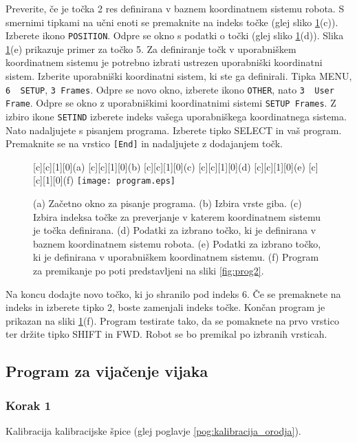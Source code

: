 Preverite, če je točka 2 res definirana v baznem koordinatnem sistemu robota. S smernimi tipkami na učni enoti se premaknite na indeks točke (glej sliko \ref{fig:program}(c)). Izberete ikono \verb|POSITION|. Odpre se okno s podatki o točki (glej sliko \ref{fig:program}(d)). Slika \ref{fig:program}(e) prikazuje primer za točko 5. Za definiranje točk v uporabniškem koordinatnem sistemu je potrebno izbrati ustrezen uporabniški koordinatni sistem. Izberite uporabniški koordinatni sistem, ki ste ga definirali. Tipka MENU, \verb|6  SETUP|, \verb|3 Frames|. Odpre se novo okno, izberete ikono \verb|OTHER|, nato \verb|3  User Frame|. Odpre se okno z uporabniškimi koordinatnimi sistemi \verb|SETUP Frames|. Z izbiro ikone \verb|SETIND| izberete indeks vašega uporabniškega koordinatnega sistema. Nato nadaljujete s pisanjem programa. Izberete tipko SELECT in vaš program. Premaknite se na vrstico \verb|[End]| in nadaljujete z dodajanjem točk. 

\begin{figure}[!hbt]
	\centering
	[c][1][0]{(a)}
	[c][1][0]{(b)}		
	[c][1][0]{(c)}
	[c][1][0]{(d)}
	[c][1][0]{(e)}	
	[c][1][0]{(f)}			
	\texttt{[image: program.eps]}
	\caption{(a) Začetno okno za pisanje programa. (b) Izbira vrste giba. (c) Izbira indeksa točke za preverjanje v katerem koordinatnem sistemu je točka definirana. (d) Podatki za izbrano točko, ki je definirana v baznem koordinatnem sistemu robota. (e) Podatki za izbrano točko, ki je definirana v uporabniškem koordinatnem sistemu. (f) Program za premikanje po poti predstavljeni na sliki \ref{fig:prog2}.}
	\label{fig:program}
\end{figure}

Na koncu dodajte novo točko, ki jo shranilo pod indeks 6. Če se premaknete na indeks in izberete tipko 2, boste zamenjali indeks točke. Končan program je prikazan na sliki \ref{fig:program}(f). Program testirate tako, da se pomaknete na prvo vrstico ter držite tipko SHIFT in FWD. Robot se bo premikal po izbranih vrsticah.

\subsection{Program za vijačenje vijaka}

\subsubsection{Korak 1} Kalibracija kalibracijske špice (glej poglavje \ref{pog:kalibracija_orodja}).
